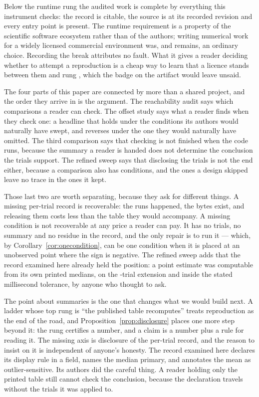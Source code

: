 Below the runtime rung the audited work is complete by everything this
instrument checks: the record is citable, the source is at its recorded revision
and every entry point is present. The runtime requirement is a property of the
scientific software ecosystem rather than of the authors; writing numerical work
for a widely licensed commercial environment was, and remains, an ordinary
choice. Recording the break attributes no fault. What it gives a reader deciding
whether to attempt a reproduction is a cheap way to learn that a licence stands
between them and rung \NRungs{}, which the badge on the artifact would leave
unsaid.

The four parts of this paper are connected by more than a shared project, and
the order they arrive in is the argument. The reachability audit says which
comparisons a reader can check. The offset study says what a reader finds when
they check one: a headline that holds under the conditions its authors would
naturally have swept, and reverses under the one they would naturally have
omitted. The third comparison says that checking is not finished when the code
runs, because the summary a reader is handed does not determine the conclusion
the trials support. The refined sweep says that disclosing the trials is not the
end either, because a comparison also has conditions, and the ones a design
skipped leave no trace in the ones it kept.

Those last two are worth separating, because they ask for different things. A
missing per-trial record is recoverable: the runs happened, the bytes exist, and
releasing them costs less than the table they would accompany. A missing
condition is not recoverable at any price a reader can pay. It has no trials, no
summary and no residue in the record, and the only repair is to run it ---
which, by Corollary~\ref{cor:onecondition}, can be one condition when it is
placed at an unobserved point where the sign is negative. The refined sweep adds
that the record examined here already held the position: a point estimate was
computable from its own printed medians, on the \NTrials{}-trial extension and
inside the stated \PredictionTolerance{} millisecond tolerance, by anyone who
thought to ask.

The point about summaries is the one that changes what we would build next. A
ladder whose top rung is ``the published table recomputes'' treats reproduction
as the end of the road, and Proposition~\ref{prop:disclosure} places one more
step beyond it: the rung certifies a number, and a claim is a number plus a rule
for reading it. The missing axis is disclosure of the per-trial record, and the
reason to insist on it is independent of anyone's honesty. The record examined
here declares its display rule in a field, names the median primary, and
annotates the mean as outlier-sensitive. Its authors did the careful thing. A
reader holding only the printed table still cannot check the conclusion, because
the declaration travels without the trials it was applied to.


